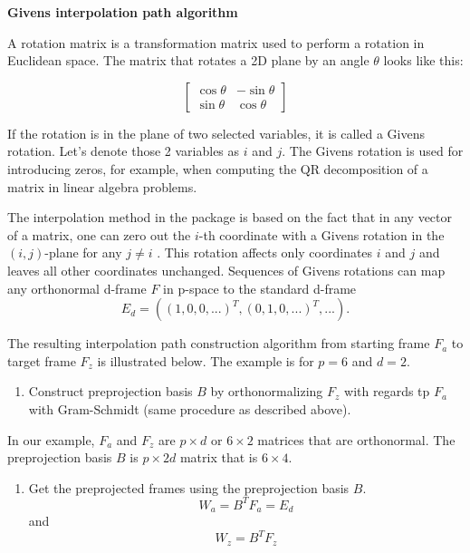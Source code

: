 \textbf{Givens interpolation path algorithm}

A rotation matrix is a transformation matrix used to perform a rotation in Euclidean space. The matrix that rotates a 2D plane by an angle \(\theta\) looks like this:

\[ \begin{bmatrix}\cos \theta &-\sin \theta \\\sin \theta &\cos \theta \end{bmatrix} \]

If the rotation is in the plane of two selected variables, it is called a Givens rotation. Let's denote those 2 variables as \(i\) and \(j\). The Givens rotation is used for introducing zeros, for example, when computing the QR decomposition of a matrix in linear algebra problems.

The interpolation method in the  package is based on the fact that in any vector of a matrix, one can zero out the \(i\)-th coordinate with a Givens rotation in the \((i, j)\)-plane for any \(j\neq i\) \citep{matrix_computation}. This rotation affects only coordinates \(i\) and \(j\) and leaves all other coordinates unchanged.
Sequences of Givens rotations can map any orthonormal d-frame \(F\) in p-space to the standard d-frame
\[E_d=((1, 0, 0, ...)^T, (0, 1, 0, ...)^T, ...).\]

The resulting interpolation path construction algorithm from starting frame \(F_a\) to target frame \(F_z\) is illustrated below. The example is for \(p=6\) and \(d=2\).

\begin{enumerate}
\def\labelenumi{\arabic{enumi}.}
\tightlist
\item
  Construct preprojection basis \(B\) by orthonormalizing \(F_z\) with regards tp \(F_a\) with Gram-Schmidt (same procedure as described above).
\end{enumerate}

In our example, \(F_a\) and \(F_z\) are \(p\times d\) or \(6\times2\) matrices that are orthonormal. The preprojection basis \(B\) is \(p\times 2d\) matrix that is \(6\times 4\).

\begin{enumerate}
\def\labelenumi{\arabic{enumi}.}
\setcounter{enumi}{1}
\tightlist
\item
  Get the preprojected frames using the preprojection basis \(B\).
  \[W_a = B^TF_a = E_d\] and \[W_z = B^TF_z\]
\end{enumerate}

